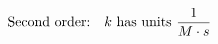 \documentclass[preview]{standalone}
\begin{document}
\begin{align*}
\special{dvisvgm:raw <g id='unique000'>}\text{Second order:} \quad k \text{ has units } \frac{1}{M \cdot s}\special{dvisvgm:raw </g>}
\end{align*}
\end{document}
